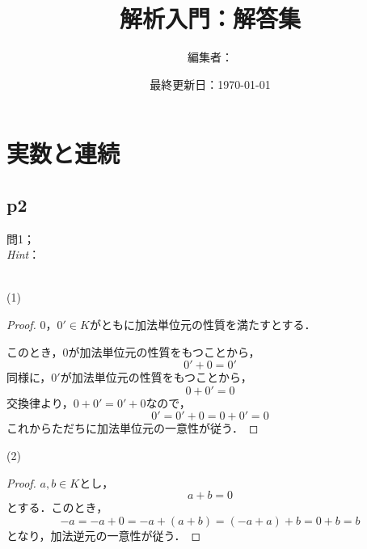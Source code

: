 \documentclass[dvipdfmx,uplatex,11pt]{jsarticle}
\title{解析入門：解答集}
\author{編集者：}
\date{最終更新日：\today}
\theoremstyle{definition}
\begin{document}
\maketitle
\tableofcontents
\newpage
%
\section{実数と連続}
%
\subsection{p2}
%
問1；\\
\textsl{Hint}：\\
\dotfill
%
\\
\begin{itembox}[c]{(1)}
    \begin{proof}
$0，0' \in K$がともに加法単位元の性質を満たすとする．\par 
このとき，$0$が加法単位元の性質をもつことから，
\[
    0'+0=0'
\]
同様に，$0'$が加法単位元の性質をもつことから，
\[
    0+0' = 0
\]
交換律より，$0+0'=0'+0$なので，
\[
    0'=0'+0 =0+0' =0
\]
これからただちに加法単位元の一意性が従う．
    \end{proof}
    \end{itembox}
    \begin{itembox}[c]{(2)}
        \begin{proof}
$a ,b \in K$とし，
\[
    a+b =0
\]
とする．このとき，
\[
    -a = -a+0 = -a +(a+b)=(-a+a)+b =0+b = b
\]
となり，加法逆元の一意性が従う．
        \end{proof}
    \end{itembox}
\end{document}
